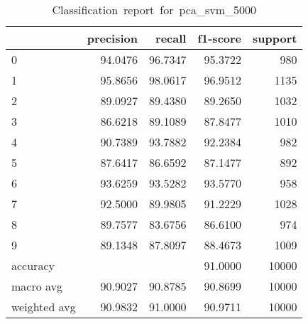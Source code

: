 \begin{table}[htb!]
    \centering
    \begin{tabular}{lrrrr}
        \toprule
                     & precision & recall  & f1-score & support \\
        \midrule
        0            & 94.0476   & 96.7347 & 95.3722  & 980     \\
        1            & 95.8656   & 98.0617 & 96.9512  & 1135    \\
        2            & 89.0927   & 89.4380 & 89.2650  & 1032    \\
        3            & 86.6218   & 89.1089 & 87.8477  & 1010    \\
        4            & 90.7389   & 93.7882 & 92.2384  & 982     \\
        5            & 87.6417   & 86.6592 & 87.1477  & 892     \\
        6            & 93.6259   & 93.5282 & 93.5770  & 958     \\
        7            & 92.5000   & 89.9805 & 91.2229  & 1028    \\
        8            & 89.7577   & 83.6756 & 86.6100  & 974     \\
        9            & 89.1348   & 87.8097 & 88.4673  & 1009    \\
        accuracy     &           &         & 91.0000  & 10000   \\
        macro avg    & 90.9027   & 90.8785 & 90.8699  & 10000   \\
        weighted avg & 90.9832   & 91.0000 & 90.9711  & 10000   \\
        \bottomrule
    \end{tabular}
    \caption{Classification\ report\ for\ pca\_svm\_5000}
    \label{tab:classification-report-pca_svm_5000}
\end{table}
